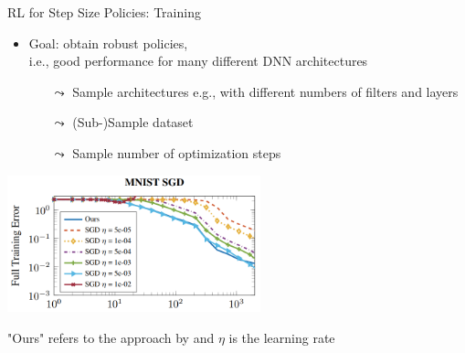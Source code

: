 \begin{frame}[c]{RL for Step Size Policies: Training }

\begin{itemize}
\item Goal: obtain robust policies,\\ i.e., good performance for many different DNN architectures
\begin{itemize}
\item[$\leadsto$] Sample architectures e.g., with different numbers of filters and layers
\item[$\leadsto$] (Sub-)Sample dataset
\item[$\leadsto$] Sample number of optimization steps
\end{itemize}
\end{itemize}

\pause 
\medskip
\centering
\includegraphics[width=0.55\textwidth]{images/l2stepsizecontroler_mnist_training.png}

"Ours" refers to the approach by  and $\eta$ is the learning rate

\end{frame}

